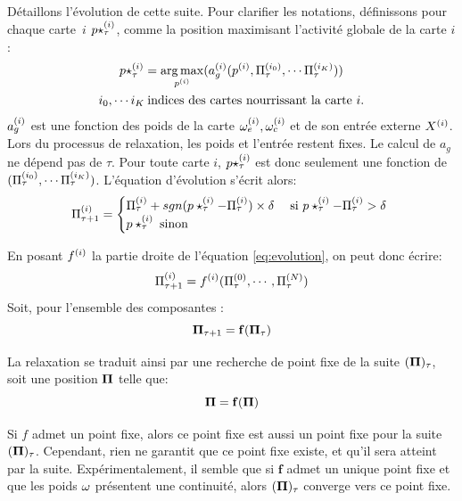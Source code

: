 Détaillons l'évolution de cette suite. Pour clarifier les notations, définissons pour chaque carte~$i$ $p\star^{({i})}_\tau$, comme la position maximisant l'activité globale de la carte $i$:
\begin{equation}
\begin{gathered}
p\star^{({i})}_{\tau} = \operatorname*{arg\,max}_{p^{({i})}}(a_g^{({i})}(p^{({i})},\Pi^{({i_0})}_\tau, \cdots \Pi^{({i_K})}_\tau))\\
 i_0, \cdots i_K \: \text{indices des cartes nourrissant la carte $i$}.
\end{gathered}
\label{eq:pstar}
\end{equation}
$a_g^{({i})}$ est une fonction des poids de la carte $\omega_{e}^{({i})}, \omega_{c}^{({i})}$ et de son entrée externe $X^{({i})}$. Lors du processus de relaxation, les poids et l'entrée restent fixes. Le calcul de $a_g$ ne dépend pas de $\tau$. Pour toute carte $i$, $p\star^{({i})}_{\tau}$ est donc seulement une fonction de $(\Pi^{({i_0})}_\tau, \cdots \Pi^{({i_K})}_\tau)$.
L'équation d'évolution s'écrit alors: 
\begin{equation}
\Pi^{({i})}_{\tau+1} = 
\begin{cases}
\Pi^{({i})}_{\tau} + sgn(p\star^{({i})}_{\tau} - \Pi^{({i})}_{\tau}) \times \delta \; & \text{si $p\star^{({i})}_{\tau} - \Pi^{({i})}_{\tau} > \delta$ } \\
p\star^{({i})}_{\tau} \; \text{sinon}	
\end{cases}
\label{eq:evolution}
\end{equation}

En posant $f^{({i})}$ la partie droite de l'équation \ref{eq:evolution}, on peut donc écrire: 
\begin{equation}
\Pi^{({i})}_{\tau +1} = f^{({i})}(\Pi^{({0})}_\tau,\cdots,\Pi^{({N})}_\tau)
\label{eq:fonction}
\end{equation}
Soit, pour l'ensemble des composantes : 
\begin{equation}
\mathbf{\Pi}_{\tau+1} = \mathbf{f}(\mathbf{\Pi}_\tau)
\end{equation}

La relaxation se traduit ainsi par une recherche de point fixe de la suite $(\mathbf{\Pi})_{\tau}$, soit une position $\mathbf{\Pi}$ telle que:
\begin{equation}
\mathbf{\Pi} = \mathbf{f}(\mathbf{\Pi})
\label{eq:suite}
\end{equation}

Si $f$ admet un point fixe, alors ce point fixe est aussi un point fixe pour la suite $(\mathbf{\Pi})_\tau$. Cependant, rien ne garantit que ce point fixe existe, et qu'il sera atteint par la suite. Expérimentalement, il semble que si $\mathbf{f}$ admet un unique point fixe et que les poids $\omega$ présentent une continuité, alors $(\mathbf{\Pi})_{\tau}$ converge vers ce point fixe. 

